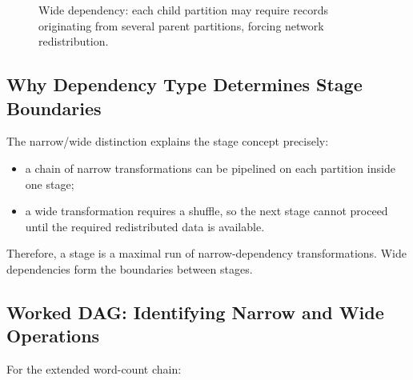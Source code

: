 \documentclass[11pt,a4paper,oneside]{book}
\begin{document}
\begin{figure}[htbp]
\centering
{}
\caption{Wide dependency: each child partition may require records originating from several parent partitions, forcing network redistribution.}
\label{fig:wide-dependency}
\end{figure}

\subsection{Why Dependency Type Determines Stage Boundaries}

The narrow/wide distinction explains the stage concept precisely:

\begin{itemize}
    \item a chain of narrow transformations can be pipelined on each partition inside one stage;
    \item a wide transformation requires a shuffle, so the next stage cannot proceed until the required redistributed data is available.
\end{itemize}

Therefore, a stage is a maximal run of narrow-dependency transformations. Wide dependencies form the boundaries between stages.

\subsection{Worked DAG: Identifying Narrow and Wide Operations}

For the extended word-count chain:
\end{document}
